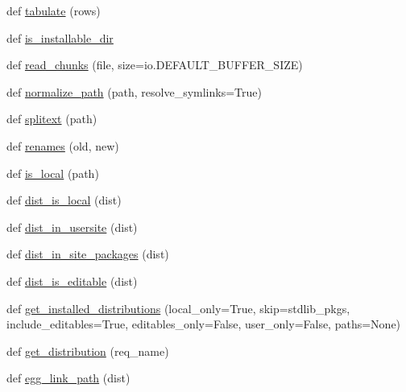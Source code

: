 \begin{DoxyCompactItemize}
\item 
def \hyperlink{namespacepip_1_1__internal_1_1utils_1_1misc_a9fa0f2c612a0507ad35d4d55c7744e72}{tabulate} (rows)
\item 
def \hyperlink{namespacepip_1_1__internal_1_1utils_1_1misc_ad542e87327094a1f57c5e454397874b4}{is\+\_\+installable\+\_\+dir}
\item 
def \hyperlink{namespacepip_1_1__internal_1_1utils_1_1misc_a25da090ad5c5713ddf62d788dac9e051}{read\+\_\+chunks} (file, size=io.\+D\+E\+F\+A\+U\+L\+T\+\_\+\+B\+U\+F\+F\+E\+R\+\_\+\+S\+I\+ZE)
\item 
def \hyperlink{namespacepip_1_1__internal_1_1utils_1_1misc_a9594cfa80c3e1c931446b2ea25904443}{normalize\+\_\+path} (path, resolve\+\_\+symlinks=True)
\item 
def \hyperlink{namespacepip_1_1__internal_1_1utils_1_1misc_a6060934981bde6e18b7e138df65640ec}{splitext} (path)
\item 
def \hyperlink{namespacepip_1_1__internal_1_1utils_1_1misc_ab071641ac0c920b213505c5ca553097f}{renames} (old, new)
\item 
def \hyperlink{namespacepip_1_1__internal_1_1utils_1_1misc_a742f4eaebb54ee9747079238b762cd7d}{is\+\_\+local} (path)
\item 
def \hyperlink{namespacepip_1_1__internal_1_1utils_1_1misc_a7c49e7eabc2e91684e232ab5a889dbef}{dist\+\_\+is\+\_\+local} (dist)
\item 
def \hyperlink{namespacepip_1_1__internal_1_1utils_1_1misc_ab48a27a21c982133f0bd2c10c7f6c45b}{dist\+\_\+in\+\_\+usersite} (dist)
\item 
def \hyperlink{namespacepip_1_1__internal_1_1utils_1_1misc_a694d1df026fbd09121e544757995f124}{dist\+\_\+in\+\_\+site\+\_\+packages} (dist)
\item 
def \hyperlink{namespacepip_1_1__internal_1_1utils_1_1misc_a9abdfe6fcceccee8a7c651f6c9014a87}{dist\+\_\+is\+\_\+editable} (dist)
\item 
def \hyperlink{namespacepip_1_1__internal_1_1utils_1_1misc_acac488b93258d2a3640442c6d29b24c5}{get\+\_\+installed\+\_\+distributions} (local\+\_\+only=True, skip=stdlib\+\_\+pkgs, include\+\_\+editables=True, editables\+\_\+only=False, user\+\_\+only=False, paths=None)
\item 
def \hyperlink{namespacepip_1_1__internal_1_1utils_1_1misc_af3cb03fe12b81f4d3c60e01ecd9cd29c}{get\+\_\+distribution} (req\+\_\+name)
\item 
def \hyperlink{namespacepip_1_1__internal_1_1utils_1_1misc_a2b5eaeaef126093e750409c6cd7e06b5}{egg\+\_\+link\+\_\+path} (dist)

\end{DoxyCompactItemize}
